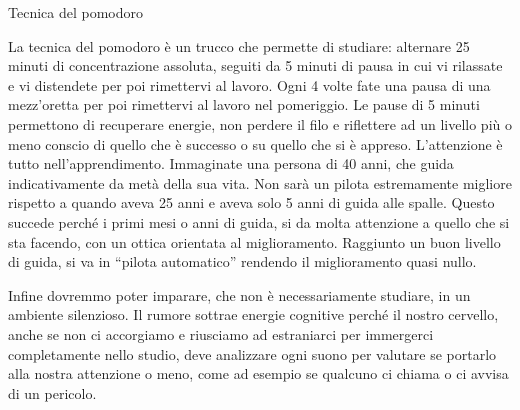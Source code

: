\documentclass[12pt]{book} %
\begin{document}
\bigskip
\begin{mdframed}[linewidth=1pt]
Tecnica del pomodoro

La tecnica del pomodoro è un trucco che permette di studiare: alternare 25 minuti di concentrazione assoluta, seguiti da
5 minuti di pausa in cui vi rilassate e vi distendete per poi rimettervi al lavoro. Ogni 4 volte fate una pausa di una
mezz'oretta per poi rimettervi al lavoro nel pomeriggio. Le pause di 5 minuti permettono di
recuperare energie, non perdere il filo e riflettere ad un livello più o meno conscio di quello che è successo o su
quello che si è appreso. L'attenzione è tutto nell'apprendimento. Immaginate
una persona di 40 anni, che guida indicativamente da metà della sua vita. Non sarà un pilota estremamente migliore
rispetto a quando aveva 25 anni e aveva solo 5 anni di guida alle spalle. Questo succede perché i primi mesi o anni di
guida, si da molta attenzione a quello che si sta facendo, con un ottica orientata al miglioramento. Raggiunto un buon
livello di guida, si va in “pilota automatico” rendendo il miglioramento quasi nullo.

Infine dovremmo poter imparare, che non è necessariamente studiare, in un ambiente silenzioso. Il rumore sottrae energie
cognitive perché il nostro cervello, anche se non ci accorgiamo e riusciamo ad estraniarci per immergerci completamente
nello studio, deve analizzare ogni suono per valutare se portarlo alla nostra attenzione o meno, come ad esempio se
qualcuno ci chiama o ci avvisa di un pericolo.
\end{mdframed}
\end{document}
